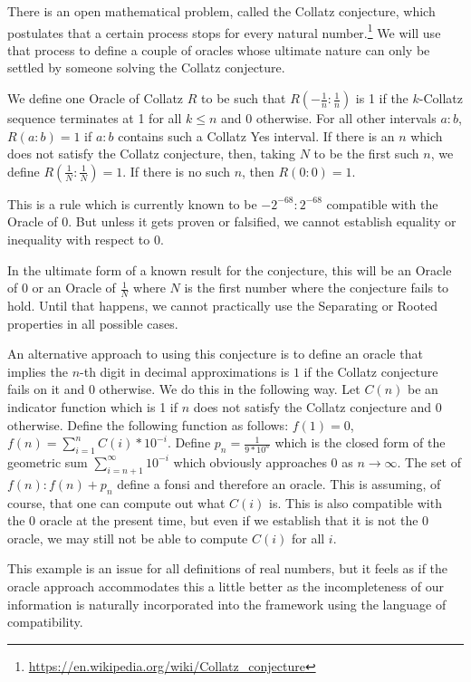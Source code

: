 \documentclass[12pt]{article}
\begin{document}
There is an open mathematical problem, called the Collatz conjecture, which postulates that a certain process stops for every natural number.\footnote{\url{https://en.wikipedia.org/wiki/Collatz_conjecture}} We will use that process to define a couple of oracles whose ultimate nature can only be settled by someone solving the Collatz conjecture. 

We define one Oracle of Collatz $R$ to be such that $R(-\tfrac{1}{n}:\tfrac{1}{n})$ is 1 if the $k$-Collatz sequence terminates at 1 for all $k \leq n$ and 0 otherwise. For all other intervals $a:b$, $R(a:b) = 1$ if $a:b$ contains such a Collatz Yes interval. If there is an $n$ which does not satisfy the Collatz conjecture, then, taking $N$ to be the first such $n$, we define $R(\tfrac{1}{N}:\tfrac{1}{N}) = 1$. If there is no such $n$, then $R(0:0) = 1$.

This is a rule which is currently known to be $-2^{-68}:2^{-68}$ compatible with the Oracle of 0. But unless it gets proven or falsified, we cannot establish equality or inequality with respect to 0. 

In the ultimate form of a known result for the conjecture, this will be an Oracle of 0 or an Oracle of $\tfrac{1}{N}$ where $N$ is the first number where the conjecture fails to hold. Until that happens, we cannot practically use the Separating or Rooted properties in all possible cases. 

An alternative approach to using this conjecture is to define an oracle that implies the $n$-th digit in decimal approximations is $1$ if the Collatz conjecture fails on it and $0$ otherwise. We do this in the following way. Let $C(n)$ be an indicator function which is 1 if $n$ does not satisfy the Collatz conjecture and 0 otherwise. Define the following function as follows: $f(1) = 0$,  $f(n) = \sum_{i=1}^n C(i)*10^{-i} $. Define $p_n = \frac{1}{9*10^n}$ which is the closed form of the geometric sum $\sum_{i=n+1}^{\infty} 10^{-i}$ which obviously approaches $0$ as $n \to \infty$. The set of $f(n): f(n) + p_n $ define a fonsi and therefore an oracle. This is assuming, of course, that one can compute out what $C(i)$ is. This is also compatible with the 0 oracle at the present time, but even if we establish that it is not the 0 oracle, we may still not be able to compute $C(i)$ for all $i$. 

This example is an issue for all definitions of real numbers, but it feels as if the oracle approach accommodates this a little better as the incompleteness of our information is naturally incorporated into the framework using the language of compatibility.
\end{document}
